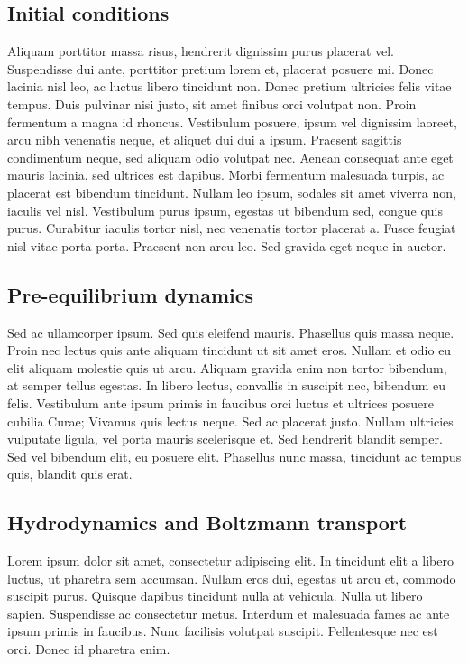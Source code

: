 \documentclass[aps,prc,reprint,amsmath,nofootinbib]{revtex4-1}
\begin{document}
\subsection{Initial conditions}

Aliquam porttitor massa risus, hendrerit dignissim purus placerat vel. Suspendisse dui ante, porttitor pretium lorem et, placerat posuere mi. Donec lacinia nisl leo, ac luctus libero tincidunt non. Donec pretium ultricies felis vitae tempus. Duis pulvinar nisi justo, sit amet finibus orci volutpat non. Proin fermentum a magna id rhoncus. Vestibulum posuere, ipsum vel dignissim laoreet, arcu nibh venenatis neque, et aliquet dui dui a ipsum. Praesent sagittis condimentum neque, sed aliquam odio volutpat nec. Aenean consequat ante eget mauris lacinia, sed ultrices est dapibus. Morbi fermentum malesuada turpis, ac placerat est bibendum tincidunt. Nullam leo ipsum, sodales sit amet viverra non, iaculis vel nisl. Vestibulum purus ipsum, egestas ut bibendum sed, congue quis purus. Curabitur iaculis tortor nisl, nec venenatis tortor placerat a. Fusce feugiat nisl vitae porta porta. Praesent non arcu leo. Sed gravida eget neque in auctor.

\subsection{Pre-equilibrium dynamics}

Sed ac ullamcorper ipsum. Sed quis eleifend mauris. Phasellus quis massa neque. Proin nec lectus quis ante aliquam tincidunt ut sit amet eros. Nullam et odio eu elit aliquam molestie quis ut arcu. Aliquam gravida enim non tortor bibendum, at semper tellus egestas. In libero lectus, convallis in suscipit nec, bibendum eu felis. Vestibulum ante ipsum primis in faucibus orci luctus et ultrices posuere cubilia Curae; Vivamus quis lectus neque. Sed ac placerat justo. Nullam ultricies vulputate ligula, vel porta mauris scelerisque et. Sed hendrerit blandit semper. Sed vel bibendum elit, eu posuere elit. Phasellus nunc massa, tincidunt ac tempus quis, blandit quis erat. 

\subsection{Hydrodynamics and Boltzmann transport}

 Lorem ipsum dolor sit amet, consectetur adipiscing elit. In tincidunt elit a libero luctus, ut pharetra sem accumsan. Nullam eros dui, egestas ut arcu et, commodo suscipit purus. Quisque dapibus tincidunt nulla at vehicula. Nulla ut libero sapien. Suspendisse ac consectetur metus. Interdum et malesuada fames ac ante ipsum primis in faucibus. Nunc facilisis volutpat suscipit. Pellentesque nec est orci. Donec id pharetra enim.
\end{document}
